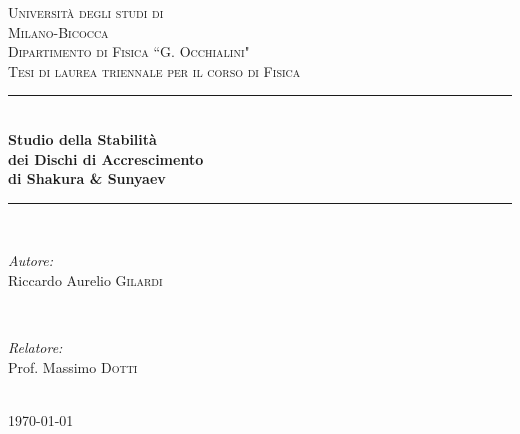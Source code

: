 \documentclass[a4paperbi]{article}
\newcommand{\HRule}{\rule{\linewidth}{0.5mm}} %
\begin{document}
\begin{titlepage}
\center %
\textsc{\LARGE Università degli studi di}\\[0.1cm]
\textsc{\LARGE Milano-Bicocca}\\[1.2cm] %
\textsc{\Large Dipartimento di Fisica ``G. Occhialini"}\\[0.5cm] %
\textsc{\large Tesi di laurea triennale per il corso di Fisica}\\[0.5cm] %
\HRule \\[0.4cm]
{ \huge \bfseries Studio della Stabilità}\\[0.1cm]
{ \huge \bfseries dei Dischi di Accrescimento}\\[0.1cm]
{ \huge \bfseries  di Shakura \& Sunyaev}\\[0.4cm] %
\HRule \\[1.5cm]
\begin{minipage}{0.4\textwidth}
\begin{flushleft} \large
\emph{Autore:}\\
Riccardo Aurelio \textsc{Gilardi} %
\end{flushleft}
\end{minipage}
~
\begin{minipage}{0.4\textwidth}
\begin{flushright} \large
\emph{Relatore:} \\
Prof. Massimo \textsc{Dotti} %
\end{flushright}
\end{minipage}\\[2cm]
{\large \today}\\[1cm] %

\end{titlepage}
\end{document}
